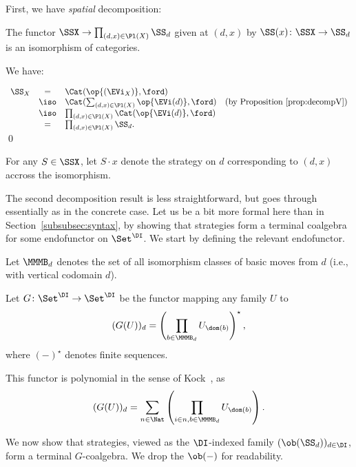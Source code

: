 \documentclass{LMCS}
\theoremstyle{plain}\newtheorem{satz}[thm]{Satz}
\begin{document}
First, we have \emph{spatial} decomposition:
   \begin{prop}\label{prop:spatial} 
     The functor $\SSX \to \prod_{(d,x) \in \Pl(X)} \SS_d$ given at
     $(d,x)$ by $\SS(x) \colon \SSX \to \SS_d$ is an isomorphism of
     categories.
   \end{prop}
   \proof
     We have:
     \begin{center}
       $
       \begin{array}[b]{rcll}
         \SS_X & = & \Cat (\op{(\EVi_{X})}, \ford) \\
         & \iso & \Cat (\sum_{(d,x) \in \Pl (X)} \op{\EVi (d)}, \ford) & \mbox{(by Proposition~\ref{prop:decompV})} \\
         & \iso & \prod_{(d,x) \in \Pl (X)} \Cat (\op{\EVi (d)}, \ford) \\
         & = & \prod_{(d,x) \in \Pl (X)} \SS_d. 
       \end{array}
       $\qed
     \end{center}
For any $S \in \SSX$, let $S \cdot x$ denote the strategy on $d$
     corresponding to $(d,x)$ accross the isomorphism.

     The second decomposition result is less straightforward, but goes
     through essentially as in the concrete case. Let us be a bit more
     formal here than in Section~\ref{subsubsec:syntax}, by showing
     that strategies form a terminal coalgebra for some endofunctor on
     $\Set^\DI$.  We start by defining the relevant endofunctor.
     

\begin{defi}
       Let $\MMMB_d$ denotes the set of all isomorphism classes of
       basic moves from $d$ (i.e., with vertical codomain $d$).
     \end{defi}
     \begin{defi}
       Let $G \colon \Set^\DI \to \Set^\DI$ be the functor
       mapping any family $U$ to $$(G (U))_d = \left (\prod_{b \in
           \MMMB_d} U_{\dom (b)} \right )^\star,$$ where $(-)^\star$
       denotes finite sequences.
     \end{defi}

     \begin{rem}\label{rem:lists}
       This functor is polynomial in the sense of
       Kock~\citep{Kock01012011}, as $$(G (U))_d = \sum_{n \in \Nat}
       \left (\prod_{i \in n, b \in \MMMB_d} U_{\dom (b)} \right ).$$
     \end{rem}
     
     We now show that strategies, viewed as the $\DI$-indexed family
     $(\ob(\SS_d))_{d \in \DI}$, form a terminal $G$-coalgebra. We drop 
     the $\ob(-)$ for readability.
     
\end{document}
